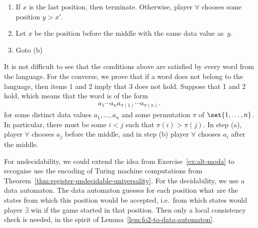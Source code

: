 {\begin{enumerate}
\begin{enumerate}
 	\item If $x$ is the last position, then terminate. Otherwise, player $\forall$ chooses some position $y > x'$.
 	\item Let $x$ be the position before the middle with the same data value as~$y$. 
 	\item Goto (b)
 	\end{enumerate}
 \end{enumerate}
 It is not difficult to see that the conditions above are satisfied by every word from the language. For the converse, we prove that if a word does not belong to the language, then items 1 and 2 imply that 3 does not hold. Suppose that 1 and 2 hold, which means that the word is of the form
 \begin{align*}
 a_1 \cdots a_n a_{\pi(1)} \cdots a_{\pi(n)}.
\end{align*}
for some distinct data values $a_1,\ldots,a_n$ and some permutation $\pi$ of $\set{1,\ldots,n}$. In particular, there must be some $i < j$ such that $\pi(i) > \pi(j)$. In step (a), player $\forall$ chooses $a_j$ before the middle, and in step (b) player $\forall$ chooses $a_i$ after the middle.}


{For undecidability, we could extend the idea from Exercise~\ref{ex:alt-moda} to recognise use the encoding of Turing machine computations from Theorem~\ref{thm:register-undecidable-universality}. For the decidability, we use a data automaton. The data automaton guesses for each position what are the states from which this position would be accepted, i.e.~from which states would player $\exists$ win if the game started in that position. Then only a local consistency check is needed, in the spirit of Lemma~\ref{lem:fo2-to-data-automaton}.}


